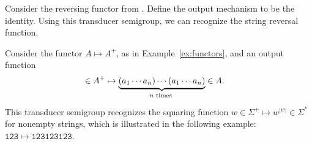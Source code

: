 \begin{example}
 Consider the reversing functor from . Define the output mechanism to be the identity. Using this transducer semigroup, we can recognize the string reversal function.
\end{example}

\begin{example}\label{ex:squaring}
 Consider the functor $A \mapsto A^+$, as in Example~\ref{ex:functors}, and an output function 
 \begin{align*}
 [a_1,\ldots,a_n] \in A^+ & \mapsto \myunderbrace{(a_1 \cdots a_n) \cdots (a_1 \cdots a_n)}{$n$ times} \in A.
 \end{align*}
 This transducer semigroup recognizes the squaring function $w \in \Sigma^+ \mapsto w^{|w|} \in \Sigma^*$ for nonempty strings, which is illustrated in the following example: $\mathtt{123 \mapsto 123123123}$.
\end{example}

 
 


